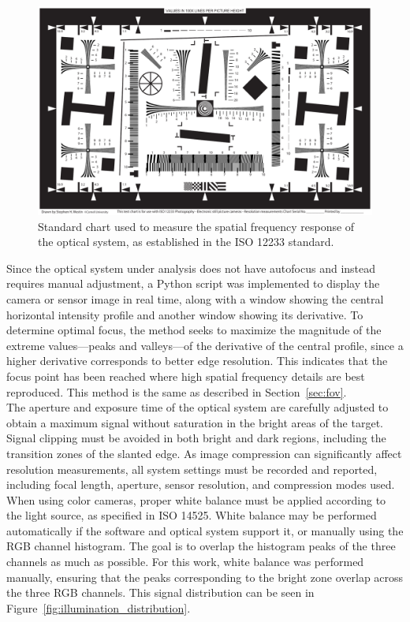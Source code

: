 \begin{figure}[H]
    \centering
    \includegraphics[width=0.95\linewidth]{Figures/C3/ISO_12233-reschart.pdf}
    \caption{Standard chart used to measure the spatial frequency response of the optical system, as established in the ISO 12233 standard.}
    \label{fig:iso12233_test_chart}
\end{figure}

Since the optical system under analysis does not have autofocus and instead requires manual adjustment, a Python script was implemented to display the camera or sensor image in real time, along with a window showing the central horizontal intensity profile and another window showing its derivative. To determine optimal focus, the method seeks to maximize the magnitude of the extreme values—peaks and valleys—of the derivative of the central profile, since a higher derivative corresponds to better edge resolution. This indicates that the focus point has been reached where high spatial frequency details are best reproduced. This method is the same as described in Section~\ref{sec:fov}.\\

The aperture and exposure time of the optical system are carefully adjusted to obtain a maximum signal without saturation in the bright areas of the target. Signal clipping must be avoided in both bright and dark regions, including the transition zones of the slanted edge. As image compression can significantly affect resolution measurements, all system settings must be recorded and reported, including focal length, aperture, sensor resolution, and compression modes used. When using color cameras, proper white balance must be applied according to the light source, as specified in ISO 14525. White balance may be performed automatically if the software and optical system support it, or manually using the RGB channel histogram. The goal is to overlap the histogram peaks of the three channels as much as possible. For this work, white balance was performed manually, ensuring that the peaks corresponding to the bright zone overlap across the three RGB channels. This signal distribution can be seen in Figure~\ref{fig:illumination_distribution}.\\


